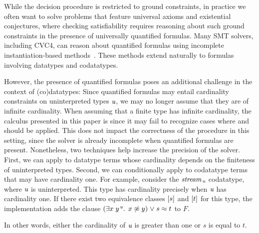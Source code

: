 While the decision procedure is restricted to ground constraints,
in practice we often want to solve problems that feature universal axioms and existential conjectures,
where checking satisfiability requires reasoning about such ground constraints in the presence of universally quantified formulas.
Many SMT solvers, including CVC4, can reason about quantified formulas using incomplete instantiation-based methods~\cite{MouraBjoerner07,ReynoldsTinelliMoura14}.
These methods extend naturally to %
formulas involving datatypes and codatatypes.

However, the presence of quantified formulas poses an additional challenge in the context of (co)datatypes:
Since quantified formulas may entail cardinality constraints on uninterpreted types $\textit{u}$,
we may no longer assume that they are of infinite cardinality.
When assuming that a finite type has infinite cardinality, the calculus
presented in this paper is 
since it may fail to recognize cases where  and  should be
applied.
This does not %
impact the correctness of the procedure in this setting,
since %
the solver is already incomplete when quantified formulas are present.
Nonetheless, two techniques help increase the precision of the solver.
First, we can apply  to datatype terms whose cardinality depends on the finiteness of uninterpreted types.
Second, we can conditionally apply  to codatatype terms that may have cardinality one.
For example, consider the $\textit{stream}_{\,\textit{u}}$ codatatype, where $\textit{u}$ is uninterpreted.
This type has cardinality precisely when $\textit{u}$ has cardinality one.
If there exist two equivalence classes $[s]$ and $[t]$ for this type,
the implementation adds the clause %
$(\exists x\;y\typ{\ty{u}}.\;\, x \not\teq y ) \mathrel\vee s \teq t$ to $F$.
\begin{rep}In other words, either the cardinality of $\textit{u}$ is greater than one or $s$ is equal to $t$.\end{rep}

